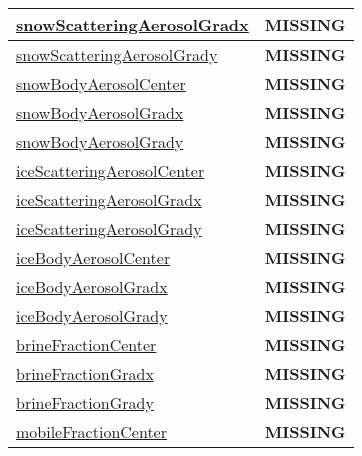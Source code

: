 {\begin{center}
\begin{longtable}{| p{2.0in} | p{4.0in} |}
    \hline
    \hyperref[subsec:var_sec_tracer_reconstruction_snowScatteringAerosolGradx]{snowScatteringAerosolGradx} & {\bf \color{red} MISSING} \\
    \hline
    \hyperref[subsec:var_sec_tracer_reconstruction_snowScatteringAerosolGrady]{snowScatteringAerosolGrady} & {\bf \color{red} MISSING} \\
    \hline
    \hyperref[subsec:var_sec_tracer_reconstruction_snowBodyAerosolCenter]{snowBodyAerosolCenter} & {\bf \color{red} MISSING} \\
    \hline
    \hyperref[subsec:var_sec_tracer_reconstruction_snowBodyAerosolGradx]{snowBodyAerosolGradx} & {\bf \color{red} MISSING} \\
    \hline
    \hyperref[subsec:var_sec_tracer_reconstruction_snowBodyAerosolGrady]{snowBodyAerosolGrady} & {\bf \color{red} MISSING} \\
    \hline
    \hyperref[subsec:var_sec_tracer_reconstruction_iceScatteringAerosolCenter]{iceScatteringAerosolCenter} & {\bf \color{red} MISSING} \\
    \hline
    \hyperref[subsec:var_sec_tracer_reconstruction_iceScatteringAerosolGradx]{iceScatteringAerosolGradx} & {\bf \color{red} MISSING} \\
    \hline
    \hyperref[subsec:var_sec_tracer_reconstruction_iceScatteringAerosolGrady]{iceScatteringAerosolGrady} & {\bf \color{red} MISSING} \\
    \hline
    \hyperref[subsec:var_sec_tracer_reconstruction_iceBodyAerosolCenter]{iceBodyAerosolCenter} & {\bf \color{red} MISSING} \\
    \hline
    \hyperref[subsec:var_sec_tracer_reconstruction_iceBodyAerosolGradx]{iceBodyAerosolGradx} & {\bf \color{red} MISSING} \\
    \hline
    \hyperref[subsec:var_sec_tracer_reconstruction_iceBodyAerosolGrady]{iceBodyAerosolGrady} & {\bf \color{red} MISSING} \\
    \hline
    \hyperref[subsec:var_sec_tracer_reconstruction_brineFractionCenter]{brineFractionCenter} & {\bf \color{red} MISSING} \\
    \hline
    \hyperref[subsec:var_sec_tracer_reconstruction_brineFractionGradx]{brineFractionGradx} & {\bf \color{red} MISSING} \\
    \hline
    \hyperref[subsec:var_sec_tracer_reconstruction_brineFractionGrady]{brineFractionGrady} & {\bf \color{red} MISSING} \\
    \hline
    \hyperref[subsec:var_sec_tracer_reconstruction_mobileFractionCenter]{mobileFractionCenter} & {\bf \color{red} MISSING} \\

\end{longtable}
\end{center}}
